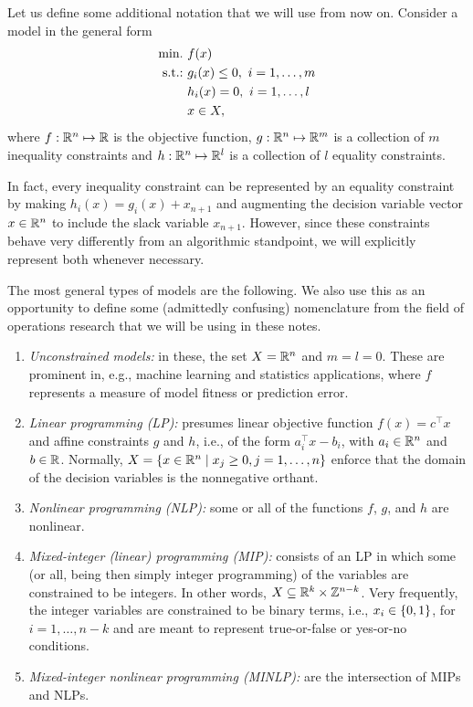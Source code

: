 Let us define some additional notation that we will use from now on. Consider a model in the general form
%
\begin{align*}
	\mathop{\text{min.~}} & f(x) \\
	\mathop{\text{s.t.:~}}   & g_i(x) \leq 0, ~i = 1, \dots, m \\
	      & h_i(x) = 0, ~i = 1, \dots, l \\
	      & x \in X,  
\end{align*}
%
where $f: \mathbb{R}^n \mapsto \mathbb{R}$ is the objective function, $g:\mathbb{R}^n \mapsto \mathbb{R}^m$ is a collection of $m$ inequality constraints and $h: \mathbb{R}^n \mapsto \mathbb{R}^l$ is a collection of $l$ equality constraints.

In fact, every inequality constraint can be represented by an equality constraint by making $h_i(x) = g_i(x) + x_{n+1}$ and augmenting the decision variable vector $x \in \mathbb{R}^n$ to include the slack variable $x_{n+1}$. However, since these constraints behave very differently from an algorithmic standpoint, we will explicitly represent both whenever necessary.

The most general types of models are the following. We also use this as an opportunity to define some (admittedly confusing) nomenclature from the field of operations research that we will be using in these notes.
%
\begin{enumerate}
    \item \emph{Unconstrained models:} in these, the set $X = \mathbb{R}^n$ and $m=l=0$. These are prominent in, e.g., machine learning and statistics applications, where $f$ represents a measure of model fitness or prediction error.  
    \item \emph{Linear programming (LP):} presumes linear objective function $f(x) = c^\top x$ and affine constraints $g$ and $h$, i.e., of the form $a_i^\top x - b_i$, with $a_i \in \mathbb{R}^n$ and $b \in \mathbb{R}$. Normally, $X = \left\{ x \in \mathbb{R}^n \mid x_j \geq 0, j = 1,\dots, n \right \}$ enforce that the domain of the decision variables is the nonnegative orthant.
    \item \emph{Nonlinear programming (NLP):} some or all of the functions $f$, $g$, and $h$ are nonlinear.
    \item \emph{Mixed-integer (linear) programming (MIP):} consists of an LP in which some (or all, being then simply integer programming) of the variables are constrained to be integers. In other words, $X \subseteq \mathbb{R}^k \times \mathbb{Z}^{n-k}$. Very frequently, the integer variables are constrained to be binary terms, i.e., $x_i \in \left\{ 0,1 \right \}$, for $i = 1,\dots, n-k$ and are meant to represent true-or-false or yes-or-no conditions.
    \item \emph{Mixed-integer nonlinear programming (MINLP):} are the intersection of MIPs and NLPs.  
\end{enumerate}

